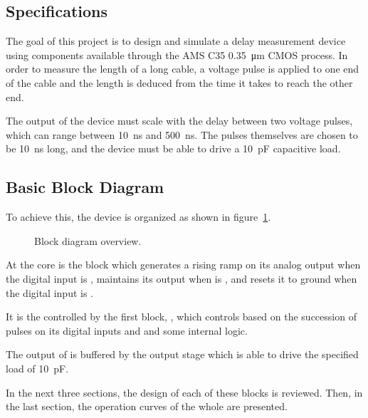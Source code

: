 \subsection{Specifications}
The goal of this project is to design and simulate a delay measurement device using components available through the AMS C35 \SI{0.35}{\micro\meter} CMOS process.
In order to measure the length of a long cable, a voltage pulse is applied to one end of the cable and the length is deduced from the time it takes to reach the other end.

The output of the device must scale with the delay between two voltage pulses, which can range between \SI{10}{\nano\second} and \SI{500}{\nano\second}.
The pulses themselves are chosen to be \SI{10}{\nano\second} long, and the device must be able to drive a \SI{10}{\pico\farad} capacitive load.

\subsection{Basic Block Diagram}
To achieve this, the device is organized as shown in figure~\ref{fig:block}.
\begin{figure}
  \centering
  \caption{Block diagram overview.\label{fig:block}}
\end{figure}

At the core is the block  which generates a rising ramp on its analog output  when the digital input  is , maintains its output when  is , and resets it to ground when the digital input  is .

It is the controlled by the first block, , which controls  based on the succession of pulses on its digital inputs  and  and some internal logic.

The output of  is buffered by the output stage  which is able to drive the specified load of \SI{10}{\pico\farad}.

In the next three sections, the design of each of these blocks is reviewed. Then, in the last section, the operation curves of the whole are presented.
